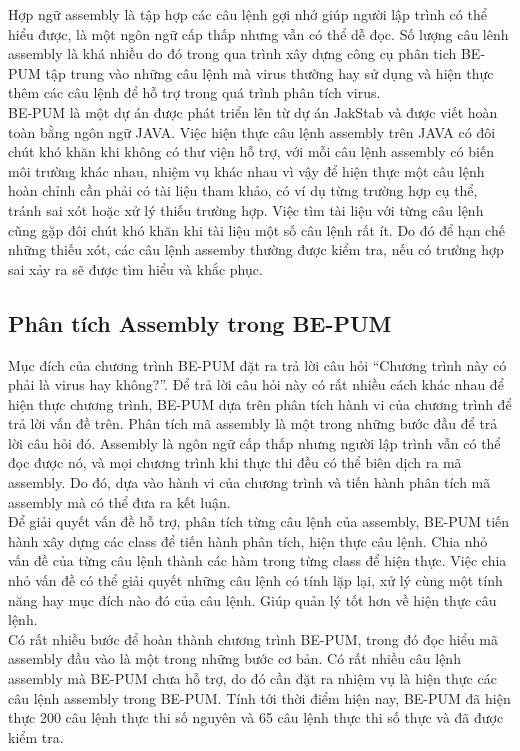 Hợp ngữ assembly là tập hợp các câu lệnh gợi nhớ giúp người lập trình có thể hiểu được, là một ngôn ngữ cấp thấp nhưng vẫn có thể dễ đọc. Số lượng câu lênh assembly là khá nhiều do đó trong qua trình xây dựng công cụ phân tich BE-PUM tập trung vào những câu lệnh mà virus thường hay sử dụng và hiện thực thêm các câu lệnh để hỗ trợ trong quá trình phân tích virus.\\

BE-PUM là một dự án được phát triển lên từ dự án JakStab và được viết hoàn toàn bằng ngôn ngữ JAVA. Việc hiện thực câu lệnh assembly trên JAVA có đôi chút khó khăn khi không có thư viện hỗ trợ, với mỗi câu lệnh assembly có biến môi trường khác nhau, nhiệm vụ khác nhau vì vậy để hiện thực một câu lệnh hoàn chỉnh cần phải có tài liệu tham khảo, có ví dụ từng trường hợp cụ thể, tránh sai xót hoặc xử lý thiếu trường hợp. Việc tìm tài liệu với từng câu lệnh cũng gặp đôi chút khó khăn khi tài liệu một số câu lệnh rất ít. Do đó để hạn chế những thiếu xót, các câu lệnh assemby thường được kiểm tra, nếu có trường hợp sai xảy ra sẽ được tìm hiểu và khắc phục.

  \subsection{Phân tích Assembly trong BE-PUM}
  Mục đích của chương trình BE-PUM đặt ra trả lời câu hỏi “Chương trình này có phải là virus hay không?”. Để trả lời câu hỏi này có rất nhiều cách khác nhau để hiện thực chương trình, BE-PUM dựa trên phân tích hành vi của chương trình để trả lời vấn đề trên. Phân tích mã assembly là một trong những bước đầu để trả lời câu hỏi đó. Assembly là ngôn ngữ cấp thấp nhưng người lập trình vẫn có thể đọc được nó, và mọi chương trình khi thực thi đều có thể biên dịch ra mã assembly. Do đó, dựa vào hành vi của chương trình và tiến hành phân tích mã assembly mà có thể đưa ra kết luận.\\

Để giải quyết vấn đề hỗ trợ, phân tích từng câu lệnh của assembly, BE-PUM tiến hành xây dựng các class để tiến hành phân tích, hiện thực câu lệnh. Chia nhỏ vấn đề của từng câu lệnh thành các hàm trong từng class để hiện thực. Việc chia nhỏ vấn đề có thể giải quyết những câu lệnh có tính lặp lại, xử lý cùng một tính năng hay mục đích nào đó của câu lệnh. Giúp quản lý tốt hơn về hiện thực câu lệnh.\\

Có rất nhiều bước để hoàn thành chương trình BE-PUM, trong đó đọc hiểu mã assembly đầu vào là một trong những bước cơ bản. Có rất nhiều câu lệnh assembly mà BE-PUM chưa hỗ trợ, do đó cần đặt ra nhiệm vụ là hiện thực các câu lệnh assembly trong BE-PUM. Tính tới thời điểm hiện nay, BE-PUM đã hiện thực 200 câu lệnh thực thi số nguyên và 65 câu lệnh thực thi số thực và đã được kiểm tra. 

